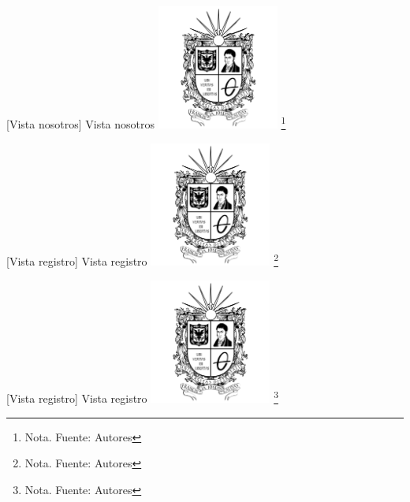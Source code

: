 {      \vspace{2mm}
    \begin{minipage}{0.9\textwidth}
    \centering
    [{Vista nosotros}]{ Vista nosotros }
    \label{prot2}
    \includegraphics[width=0.3\textwidth]{Content/Images/Escudo_UD.png}
    \footnote{Nota. \textup{Fuente: Autores}}
    \end{minipage}
    
    \vspace{2mm}
    \begin{minipage}{0.9\textwidth}
    \centering
    [{Vista registro}]{ Vista registro }
    \label{prot3}
    \includegraphics[width=0.3\textwidth]{Content/Images/Escudo_UD.png}
    \footnote{Nota. \textup{Fuente: Autores}}
    \end{minipage}
    
    \vspace{2mm}
    \begin{minipage}{0.9\textwidth}
    \centering
    [{Vista registro}]{ Vista registro }
    \label{prot4}
    \includegraphics[width=0.3\textwidth]{Content/Images/Escudo_UD.png}
    \footnote{Nota. \textup{Fuente: Autores}}
    \end{minipage}
    
}
